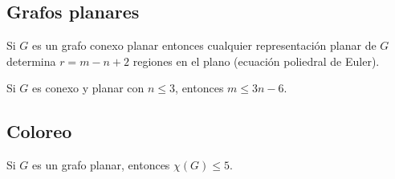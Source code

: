 \subsection{Grafos planares}

\begin{teo}[Euler, 1752]
    Si $G$ es un grafo conexo planar entonces cualquier representación planar de $G$ determina $r = m - n + 2$ regiones en el plano (ecuación poliedral de Euler).
\end{teo}

\begin{lema}
\label{planarMayor3}
    Si $G$ es conexo y planar con $n \leq 3$, entonces $m \leq 3n - 6$.
\end{lema}

\subsection{Coloreo}

\begin{teo}[Headwood, 1890]
    Si $G$ es un grafo planar, entonces $\chi(G) \leq 5$.
\end{teo}

